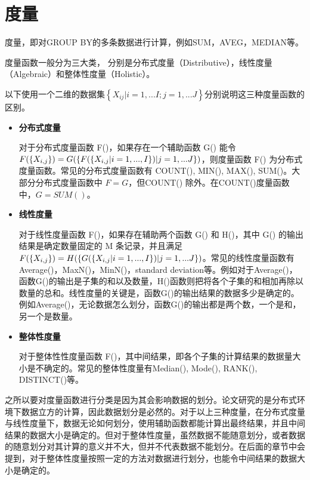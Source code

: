 \section{度量}

度量，即对GROUP BY的多条数据进行计算，例如SUM，AVEG，MEDIAN等。

度量函数一般分为三大类， 分别是分布式度量（Distributive），线性度量（Algebraic）和整体性度量（Holistic）。

以下使用一个二维的数据集$\left\{ {X}_{ij}|i=1,...I; j=1,...J \right\}$分别说明这三种度量函数的区别。

\begin{itemize}

\item \textbf{分布式度量}

对于分布式度量函数 F()，如果存在一个辅助函数 G() 能令 $F(\text\{ {X}_{i,j} \text\}) = G(\text\{ F(\text\{ {X}_{i,j}|i=1,...,I \text\})|j=1,...J \text\})$，则度量函数 F() 为分布式度量函数。常见的分布式度量函数有 COUNT(), MIN(), MAX(), SUM()。大部分分布式度量函数中 $F=G$，但COUNT() 除外。在COUNT()度量函数中，$G=SUM()$。

\item \textbf{线性度量}

对于线性度量函数 F()，如果存在辅助两个函数 G() 和 H()，其中 G() 的输出结果是确定数量固定的 M 条记录，并且满足$F(\text\{ {X}_{i,j} \text\}) = H(\text\{ G(\text\{ {X}_{i,j}|i=1,...,I \text\})|j=1,...J \text\})$。常见的线性度量函数有Average()，MaxN()，MinN()，standard deviation等。例如对于Average()，函数G()的输出是子集的和以及数量，H()函数则把将各个子集的和相加再除以数量的总和。线性度量的关键是，函数G()的输出结果的数据多少是确定的。例如Average()，无论数据怎么划分，函数G()的输出都是两个数，一个是和，另一个是数量。

\item \textbf{整体性度量}

对于整体性性度量函数 F()，其中间结果，即各个子集的计算结果的数据量大小是不确定的。常见的整体性度量有Median(), Mode(), RANK(), DISTINCT()等。

\end{itemize}

之所以要对度量函数进行分类是因为其会影响数据的划分。论文研究的是分布式环境下数据立方的计算，因此数据划分是必然的。对于以上三种度量，在分布式度量与线性度量下，数据无论如何划分，使用辅助函数都能计算出最终结果，并且中间结果的数据大小是确定的。但对于整体性度量，虽然数据不能随意划分，或者数据的随意划分对其计算的意义并不大，但并不代表数据不能划分。在后面的章节中会提到，对于整体性度量按照一定的方法对数据进行划分，也能令中间结果的数据大小是确定的。

